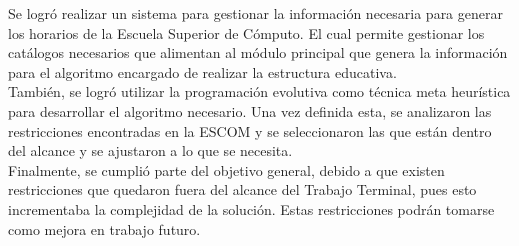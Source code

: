 \label{sec:conclusiones}

Se logró realizar un sistema para gestionar la información necesaria para generar los horarios de la Escuela Superior de Cómputo. El cual permite gestionar los catálogos necesarios que alimentan al módulo principal que genera la información para el algoritmo encargado de realizar la estructura educativa. \\

También, se logró utilizar la programación evolutiva como técnica meta heurística para desarrollar el algoritmo necesario. Una vez definida esta, se analizaron las restricciones encontradas en la ESCOM y se seleccionaron las que están dentro del alcance y se ajustaron a lo que se necesita. \\

Finalmente, se cumplió parte del objetivo general, debido a que existen restricciones que quedaron fuera del alcance del Trabajo Terminal, pues esto incrementaba la complejidad de la solución. Estas restricciones podrán tomarse como mejora en trabajo futuro.